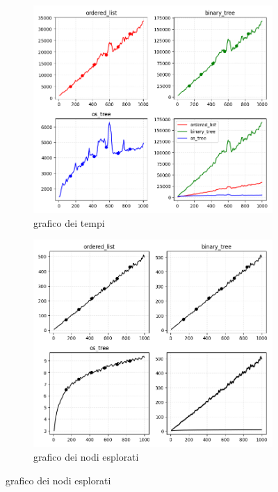 \documentclass{article}
\begin{document}
\begin{figure}[htbp]
    \caption{\textbf{os\_select}}
    \centering
    \begin{subfigure}[b]{0.45\textwidth}
        \includegraphics[width=\linewidth]{graphs1}
        \small
        \caption{grafico dei tempi}
    \end{subfigure}
    \hfill
    \begin{subfigure}[b]{0.45\textwidth}
        \includegraphics[width=\linewidth]{graphs2}
        \caption{grafico dei nodi esplorati}
    \end{subfigure}    
\end{figure} 
\end{document}
